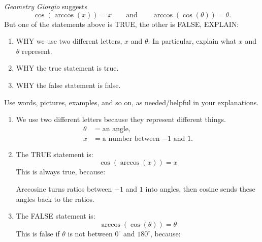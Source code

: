 \documentclass[noauthor,nooutcomes,handout,hints]{ximera}
\begin{document}
\begin{question}
  \textit{Geometry Giorgio} suggests
  \[
  \cos(\arccos(x)) = x \qquad \text{and} \qquad \arccos(\cos(\theta))
  =\theta.
  \]
  But one of the statements above is TRUE, the other is FALSE,
  EXPLAIN:
  \begin{enumerate}
  \item WHY we use two different letters, $x$ and $\theta$. In
    particular, explain what $x$ and $\theta$ represent.
  \item WHY the true statement is true.
  \item WHY the false statement is false.
  \end{enumerate}
  Use words, pictures, examples, and so on, as needed/helpful in your
  explanations.
  \begin{freeResponse}
    \begin{enumerate}
    \item We use two different letters because they represent
      different things.
      \begin{align*}
        \theta &= \text{an angle},\\
        x &=\text{a number between $-1$ and $1$}.
      \end{align*}
    \item The TRUE statement is:
      \[
      \cos(\arccos(x)) = x
      \]
      This is always true, because:
      \begin{center}
      \end{center}
      Arccosine turns ratios between $-1$ and $1$ into angles, then
      cosine sends these angles back to the ratios.
    \item The FALSE statement is:
      \[
      \arccos(\cos(\theta)) = \theta
      \]
      This is false if $\theta$ is not between $0^\circ$ and
      $180^\circ$, because:
      \begin{center}
\end{center}
\end{enumerate}
\end{freeResponse}
\end{question}
\end{document}
